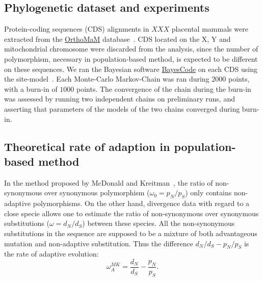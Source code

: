 \documentclass{article}
\begin{document}
\subsection*{Phylogenetic dataset and experiments}
Protein-coding sequences (CDS) alignments in $XXX$ placental mammals were extracted from the \href{http://www.orthomam.univ-montp2.fr}{OrthoMaM} database~\citep{Ranwez2007, Douzery2014, Scornavacca2019}.
CDS located on the X, Y and mitochondrial chromosome were discarded from the analysis, since the number of polymorphism, necessary in population-based method, is expected to be different on these sequences.
We ran the Bayesian software \href{https://github.com/bayesiancook/bayescode}{BayesCode} on each CDS using the site-model~\citep{Lartillot2013, Rodrigue2016}.
Each Monte-Carlo Markov-Chain was ran during $2000$ points, with a burn-in of $1000$ points.
The convergence of the chain during the burn-in was assessed by running two independent chains on preliminary runs, and asserting that parameters of the models of the two chains converged during burn-in.

\subsection*{Theoretical rate of adaption in population-based method}
In the method proposed by McDonald and Kreitman~\citep{McDonald1991}, the ratio of non-synonymous over synonymous polymorphism ($\omega_{0}=p_N/p_S$) only contains non-adaptive polymorphisms.
On the other hand, divergence data with regard to a close specie allows one to estimate the ratio of non-synonymous over synonymous substitutions ($\omega=d_N/d_S$) between these species.
All the non-synonymous substitutions in the sequence are supposed to be a mixture of both advantageous mutation and non-adaptive substitution.
Thus the difference $d_N/d_S - p_N/p_S$ is the rate of adaptive evolution:
\begin{equation*}
	\omega_A^{MK}=\dfrac{d_N}{d_S} - \dfrac{p_N}{p_S}.
\end{equation*}
\end{document}
